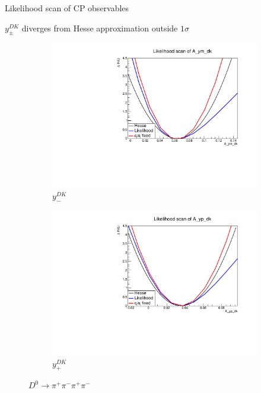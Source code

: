 \documentclass[xcolor={dvipsnames}]{beamer}
\begin{document}
\begin{frame}{Likelihood scan of CP observables}
  \begin{center}
    $y_\pm^{DK}$ diverges from Hesse approximation outside $1\sigma$
  \end{center}
  \begin{figure}
    \centering
    \begin{subfigure}{0.5\textwidth}
      \centering
      \includegraphics[width=1.0\textwidth]{Plots/A_ym_dk_likelihood_scan_pipipipi.pdf}
      \vspace{-0.3cm}
      \caption*{$y_-^{DK}$}
    \end{subfigure}%
    \begin{subfigure}{0.5\textwidth}
      \centering
      \includegraphics[width=1.0\textwidth]{Plots/A_yp_dk_likelihood_scan_pipipipi.pdf}
      \vspace{-0.3cm}
      \caption*{$y_+^{DK}$}
    \end{subfigure}
    \caption*{$D^0\to\pi^+\pi^-\pi^+\pi^-$}
  \end{figure}
\end{frame}
\end{document}
